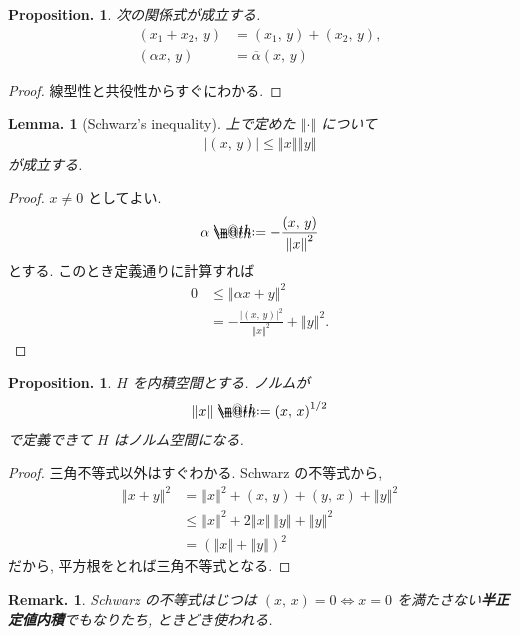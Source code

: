 \documentclass[openany, a4paper, oneside]{jsbook}
\makeatletter
\newcommand*{\defeq}{\mathrel{\rlap{%
\raisebox{0.3ex}{$\m@th\cdot$}}%
\raisebox{-0.3ex}{$\m@th\cdot$}}%
=}
\theoremstyle{break}
\newtheorem{lem}[thm]{Lemma.}
\newtheorem{prop}[thm]{Proposition.}
\theoremstyle{breakdefn}
\newtheorem{rem}[thm]{Remark.}
\newcommand{\abs}[1]{\left|#1\right|}
\newcommand{\norm}[1]{\left\Vert#1\right\Vert}
\newcommand{\rbk}[1]{\left (#1\right)}
\newcommand{\rbkt}[2]{\left ( #1,\,#2 \right)}
\makeatother
\begin{document}
\begin{prop}
 次の関係式が成立する.
 \begin{align}
  \rbkt{x_1 + x_2}{y}
  &=
  \rbkt{x_1}{y} + \rbkt{x_2}{y}, \\
  \rbkt{\alpha x}{y}
  &=
  \overline{\alpha} \rbkt{x}{y}
 \end{align}
\end{prop}
\begin{proof}
線型性と共役性からすぐにわかる.
\end{proof}
\begin{lem}[Schwarz's inequality]
 上で定めた $\norm{\cdot}$ について
 \begin{align}
  \abs{\rbkt{x}{y}}
  \leq
  \norm{x} \norm{y}
 \end{align}
 が成立する.
\end{lem}
\begin{proof}
$x \neq 0$ としてよい.
\begin{align}
 \alpha
 \defeq
 -\frac{\rbkt{x}{y}}{\norm{x}^2}
\end{align}
とする.
このとき定義通りに計算すれば
\begin{align}
 0
 &\le
 \norm{\alpha x + y}^2 \\
 &=
 -\frac{\abs{\rbkt{x}{y}}^2}{\norm{x}^2} + \norm{y}^2.
\end{align}
\end{proof}

\begin{prop}
 $H$ を内積空間とする.
 ノルムが
 \begin{align}
  \norm{x}
  \defeq
  \rbkt{x}{x}^{1/2}
 \end{align}
 で定義できて $H$ はノルム空間になる.
\end{prop}
\begin{proof}
三角不等式以外はすぐわかる.
Schwarz の不等式から,
\begin{align}
 \norm{x + y}^2
 &=
 \norm{x}^2 + \rbkt{x}{y} + \rbkt{y}{x} + \norm{y}^2 \\
 &\le
 \norm{x}^2  + 2 \norm{x} \, \norm{y} + \norm{y}^2 \\
 &=
 \rbk{\norm{x} + \norm{y}}^2
\end{align}
だから, 平方根をとれば三角不等式となる.
\end{proof}
\begin{rem}
Schwarz の不等式はじつは
$\rbkt{x}{x} = 0 \Leftrightarrow x = 0$
を満たさない\textbf{半正定値内積}でもなりたち, ときどき使われる.
\end{rem}
\end{document}
